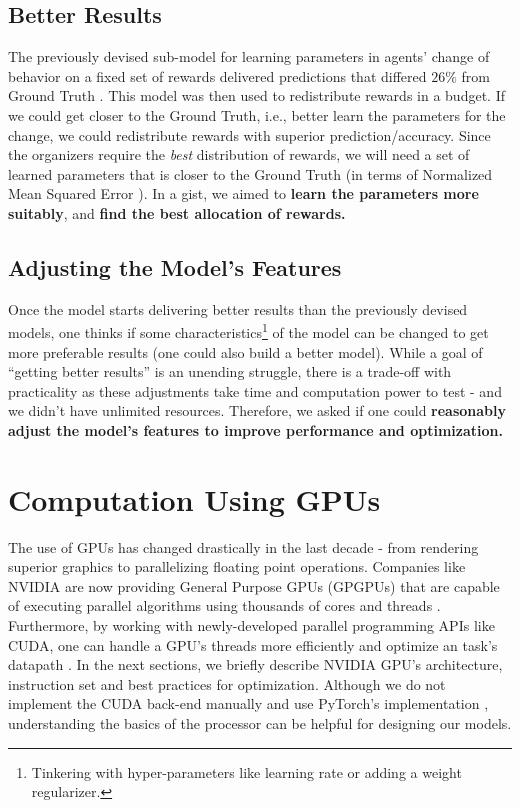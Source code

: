 \subsection{Better Results} \label{sec:Important Questions - Better Results}
The previously devised sub-model for learning parameters in agents' change of behavior on a fixed set of rewards delivered predictions that differed $26\%$ from Ground Truth \cite[Table 1]{Xue2016Avi2}. This model was then used to redistribute rewards in a budget. If we could get closer to the Ground Truth, i.e., better learn the parameters for the change, we could redistribute rewards with superior prediction/accuracy. Since the organizers require the \textit{best} distribution of rewards, we will need a set of learned parameters that is closer to the Ground Truth (in terms of Normalized Mean Squared Error \cite[Section 4.2]{Xue2016Avi2}). In a gist, we aimed to \textbf{learn the parameters more suitably}, and \textbf{find the  best allocation of rewards.}

\subsection{Adjusting the Model's Features} \label{sec:Important Questions - Adjusting the Model's Features}
Once the model starts delivering better results than the previously devised models, one thinks if some characteristics\footnote{Tinkering with hyper-parameters like learning rate or adding a weight regularizer.} of the model can be changed to get more preferable results (one could also build a better model). While a goal of ``getting better results'' is an unending struggle, there is a trade-off with practicality as these adjustments take time and computation power to test - and we didn't have unlimited resources. Therefore, we asked if one could \textbf{reasonably adjust the model's features to improve performance and optimization.}

\section{Computation Using GPUs} \label{sec:Computation Using GPUs}
The use of GPUs has changed drastically in the last decade - from rendering superior graphics to parallelizing floating point operations. Companies like NVIDIA are now providing General Purpose GPUs (GPGPUs) that are capable of executing parallel algorithms using thousands of cores and threads \cite{NVIDIA}. Furthermore, by working with newly-developed parallel programming APIs like CUDA, one can handle a GPU's threads more efficiently and optimize an task's datapath \cite{CUDADocs}. In the next sections, we briefly describe NVIDIA GPU's architecture, instruction set and best practices for optimization. Although we do not implement the CUDA back-end manually and use PyTorch's implementation \cite{PTDocs}, understanding the basics of the processor can be helpful for designing our models.

